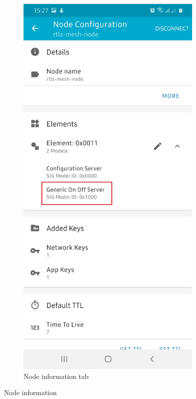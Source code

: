 \documentclass[\main/main.tex]{subfiles}
\begin{document}
\begin{figure}[H]
\begin{subfigure}[b]{0.4\linewidth}
        \includegraphics[width=0.65\linewidth]{nRF_Mesh_05.jpg}
        \caption{Node information tab}
        \label{fig:node_element}
    \end{subfigure}
    \caption{Node information}
    \label{fig:node_information}
\end{figure}
\end{document}
